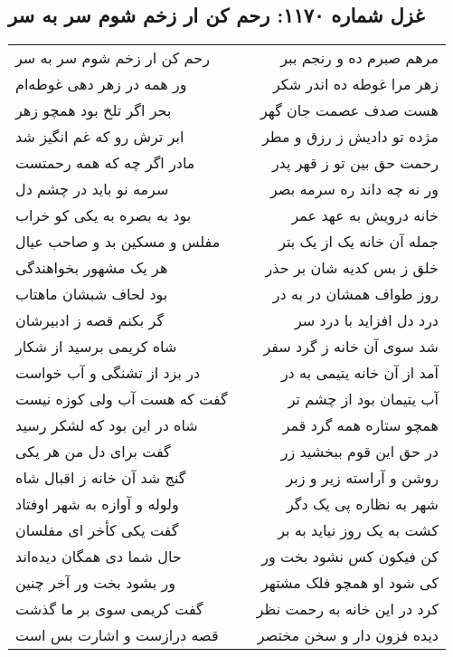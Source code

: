 \begin{center}
\section*{غزل شماره ۱۱۷۰: رحم کن ار زخم شوم سر به سر}
\label{sec:1170}
\begin{longtable}{l p{0.5cm} r}
رحم کن ار زخم شوم سر به سر
&&
مرهم صبرم ده و رنجم ببر
\\
ور همه در زهر دهی غوطه‌ام
&&
زهر مرا غوطه ده اندر شکر
\\
بحر اگر تلخ بود همچو زهر
&&
هست صدف عصمت جان گهر
\\
ابر ترش رو که غم انگیز شد
&&
مژده تو دادیش ز رزق و مطر
\\
مادر اگر چه که همه رحمتست
&&
رحمت حق بین تو ز قهر پدر
\\
سرمه نو باید در چشم دل
&&
ور نه چه داند ره سرمه بصر
\\
بود به بصره به یکی کو خراب
&&
خانه درویش به عهد عمر
\\
مفلس و مسکین بد و صاحب عیال
&&
جمله آن خانه یک از یک بتر
\\
هر یک مشهور بخواهندگی
&&
خلق ز بس کدیه شان بر حذر
\\
بود لحاف شبشان ماهتاب
&&
روز طواف همشان در به در
\\
گر بکنم قصه ز ادبیرشان
&&
درد دل افزاید با درد سر
\\
شاه کریمی برسید از شکار
&&
شد سوی آن خانه ز گرد سفر
\\
در بزد از تشنگی و آب خواست
&&
آمد از آن خانه یتیمی به در
\\
گفت که هست آب ولی کوزه نیست
&&
آب یتیمان بود از چشم تر
\\
شاه در این بود که لشکر رسید
&&
همچو ستاره همه گرد قمر
\\
گفت برای دل من هر یکی
&&
در حق این قوم ببخشید زر
\\
گنج شد آن خانه ز اقبال شاه
&&
روشن و آراسته زیر و زبر
\\
ولوله و آوازه به شهر اوفتاد
&&
شهر به نظاره پی یک دگر
\\
گفت یکی کأخر ای مفلسان
&&
کشت به یک روز نیاید به بر
\\
حال شما دی همگان دیده‌اند
&&
کن فیکون کس نشود بخت ور
\\
ور بشود بخت ور آخر چنین
&&
کی شود او همچو فلک مشتهر
\\
گفت کریمی سوی بر ما گذشت
&&
کرد در این خانه به رحمت نظر
\\
قصه درازست و اشارت بس است
&&
دیده فزون دار و سخن مختصر
\\
\end{longtable}
\end{center}
